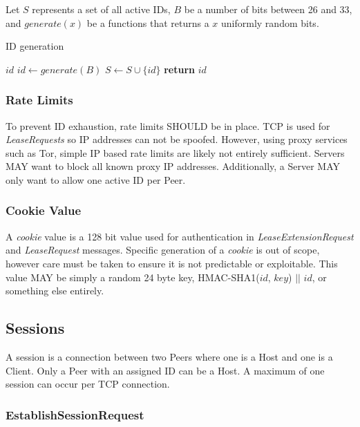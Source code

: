 \documentclass{article}
\begin{document}
    Let $S$ represents a set of all active IDs, $B$ be a number of bits between 26 and 33, and $generate(x)$ be a
    functions that returns a $x$ uniformly random bits.

    \begin{algorithm}
        \caption{ID generation}
        \begin{algorithmic}
            \State $id$
            \Repeat
                \State $id\gets generate(B)$
            \State $S\gets S\cup \{id\}$
            \State \textbf{return} $id$
        \end{algorithmic}
    \end{algorithm}

    \subsubsection{Rate Limits}

    To prevent ID exhaustion, rate limits SHOULD be in place. TCP is used for \emph{LeaseRequests} so IP addresses
    can not be spoofed. However, using proxy services such as Tor, simple IP based rate limits are likely not
    entirely sufficient. Servers MAY want to block all known proxy IP addresses. Additionally, a Server MAY only want
    to allow one active ID per Peer.

    \subsubsection{Cookie Value}

    A \emph{cookie} value is a 128 bit value used for authentication in \emph{LeaseExtensionRequest} and
    \emph{LeaseRequest} messages. Specific generation of a \emph{cookie} is out of scope, however care must be taken
    to ensure it is not predictable or exploitable. This value MAY be simply a random 24 byte key, HMAC-SHA1($id$,
    $key$) $||$ $id$, or something else entirely.

    \subsection{Sessions}

    A session is a connection between two Peers where one is a Host and one is a Client. Only a Peer with an
    assigned ID can be a Host. A maximum of one session can occur per TCP connection.

    \subsubsection{EstablishSessionRequest}
\end{document}
